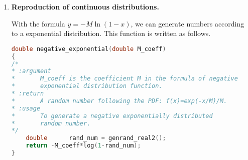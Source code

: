 \documentclass{article}
\begin{document}
\begin{enumerate}
\begin{enumerate}[label=(\alph*)]
\begin{lstlisting}[language=C]
    printf("\n");
    printf("\n Accumulative distribution(repartition) percentage:\n");
    for(int i=1; i < size; i++)
    {
        Array[i] += Array[i - 1];
    }
    for(int i=0; i < size; i++)
    {
        printf(" %.2lf%% ", 100 * Array[i]/(double)drawings);
    }
    printf("\n");
}
\end{lstlisting}

I use this simulated distribution to generate my own data:

\begin{lstlisting}[language=C]
int another_distribution(void)
{
/*
* :return  
*       A random number which corresponds to a class.
* :usage
*       To generate a class randomly with a given repartition 
*       function which is a simulated distribution.
*/
    double      Array[5] = {0.2, 0.3, 0.5, 0.8, 1};
    double      rand_num = genrand_real2();
    for(int i=0; i<5; i++)
    {
        if(rand_num < Array[i])
        {
            return i;
        }
    }
    return -1;
}
\end{lstlisting}
My own data generated using this distribution is checked with function "test\_reproduction", result is given below.
\begin{messageshell}
 1000 drawings:

 Probabilistic distribution percentage:
 19.20%

 Accumulative distribution(repartition) percentage:
 19.20%

 1000 000 drawings:

 Probabilistic distribution percentage:
 20.10%

 Accumulative distribution(repartition) percentage:
 20.10%

\end{messageshell}
\end{enumerate}
\item{\textbf{Reproduction of continuous distributions.}}

With the formula $y=-M\ln(1-x)$, we can generate numbers according to a exponential distribution. This function is written as follows.

\begin{lstlisting}[language=C]
double negative_exponential(double M_coeff)
{
/*
* :argument 
*       M_coeff is the coefficient M in the formula of negative 
*       exponential distribution function. 
* :return  
*       A random number following the PDF: f(x)=exp(-x/M)/M.
* :usage
*       To generate a negative exponentially distributed 
*       random number.
*/
    double      rand_num = genrand_real2();
    return -M_coeff*log(1-rand_num);
}
\end{lstlisting}


\end{enumerate}
\end{document}
